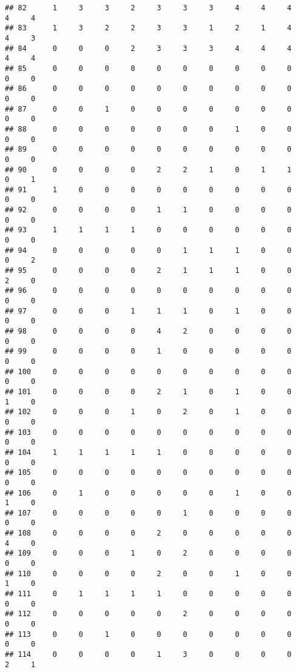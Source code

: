 \documentclass[
]{article}
\begin{document}
\begin{verbatim}
## 82      1     3     3     2     3     3     3     4     4     4     4     4
## 83      1     3     2     2     3     3     1     2     1     4     4     3
## 84      0     0     0     2     3     3     3     4     4     4     4     4
## 85      0     0     0     0     0     0     0     0     0     0     0     0
## 86      0     0     0     0     0     0     0     0     0     0     0     0
## 87      0     0     1     0     0     0     0     0     0     0     0     0
## 88      0     0     0     0     0     0     0     1     0     0     0     0
## 89      0     0     0     0     0     0     0     0     0     0     0     0
## 90      0     0     0     0     2     2     1     0     1     1     0     1
## 91      1     0     0     0     0     0     0     0     0     0     0     0
## 92      0     0     0     0     1     1     0     0     0     0     0     0
## 93      1     1     1     1     0     0     0     0     0     0     0     0
## 94      0     0     0     0     0     1     1     1     0     0     0     2
## 95      0     0     0     0     2     1     1     1     0     0     2     0
## 96      0     0     0     0     0     0     0     0     0     0     0     0
## 97      0     0     0     1     1     1     0     1     0     0     0     0
## 98      0     0     0     0     4     2     0     0     0     0     0     0
## 99      0     0     0     0     1     0     0     0     0     0     0     0
## 100     0     0     0     0     0     0     0     0     0     0     0     0
## 101     0     0     0     0     2     1     0     1     0     0     1     0
## 102     0     0     0     1     0     2     0     1     0     0     0     0
## 103     0     0     0     0     0     0     0     0     0     0     0     0
## 104     1     1     1     1     1     0     0     0     0     0     0     0
## 105     0     0     0     0     0     0     0     0     0     0     0     0
## 106     0     1     0     0     0     0     0     1     0     0     1     0
## 107     0     0     0     0     0     1     0     0     0     0     0     0
## 108     0     0     0     0     2     0     0     0     0     0     4     0
## 109     0     0     0     1     0     2     0     0     0     0     0     0
## 110     0     0     0     0     2     0     0     1     0     0     1     0
## 111     0     1     1     1     1     0     0     0     0     0     0     0
## 112     0     0     0     0     0     2     0     0     0     0     0     0
## 113     0     0     1     0     0     0     0     0     0     0     0     0
## 114     0     0     0     0     1     3     0     0     0     0     2     1

\end{verbatim}
\end{document}
